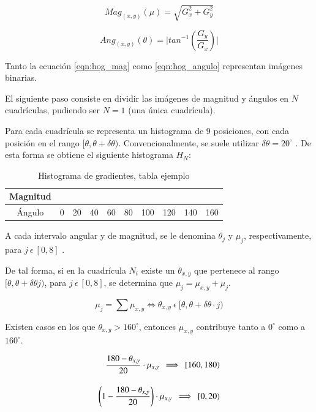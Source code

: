 \begin{equation}
	\label{eqn:hog_mag}
	Mag_{(x,y)} (\mu)= \sqrt{G_{x}^{2}+G_{y}^{2}}
\end{equation}

\begin{equation}
	\label{eqn:hog_angulo}
	Ang_{(x,y)} (\theta) = \lvert tan^{-1}(\dfrac{G_{y}}{G_{x}})\lvert
\end{equation}

Tanto la ecuación \ref{eqn:hog_mag} como \ref{eqn:hog_angulo} representan imágenes binarias.

El siguiente paso consiste en dividir las imágenes de magnitud y ángulos en $ N $ cuadrículas, pudiendo ser $ N = 1 $ (una única cuadrícula).

Para cada cuadrícula se representa un histograma de 9 posiciones, con cada posición en el rango $ [\theta,\theta+\delta\theta) $. Convencionalmente, se suele utilizar $\delta\theta = 20^{\circ}$ . De esta forma se obtiene el siguiente histograma $ H_{N}$:

\begin{table}[htb]
	\centering
	\caption{Histograma de gradientes, tabla ejemplo}
	\label{tab:hog_histograma_tabla}
	\begin{tabular}{|c||c|c|c|c|c|c|c|c|c|}
		\hline
		Magnitud &    &    &    &    &    &     &     &     &     \\ \hline
		Ángulo   & 0  & 20 & 40 & 60 & 80 & 100 & 120 & 140 & 160 \\ \hline
	\end{tabular}
\end{table}

A cada intervalo angular y de magnitud, se le denomina $ \theta_{j} $ y $ \mu_{j} $, respectivamente, para $ j\:\epsilon\:[0,8]$ .

De tal forma, si en la cuadrícula $ N_{i} $ existe un $\theta_{x,y}$ que pertenece al rango $ [\theta,\theta+\delta\theta j) $, para $ j\:\epsilon\:[0,8]$, se determina que $ \mu_{j} = \mu_{x,y} + \mu_{j}$.

\begin{equation}
	\label{eqn:hog_sum_magnitudes}
	\mu_{j} = \sum{\mu_{x,y}} \iff \theta_{x,y}\:\epsilon\:[\theta,\theta+\delta\theta \cdot j)
\end{equation}

Existen casos en los que $\theta_{x,y} > 160^{\circ}$, entonces $\mu_{x,y}$ contribuye tanto a $ 0^{\circ} $ como a $160^{\circ}$.

\begin{equation}
	\setlength{\jot}{14pt}
	\label{eqn:hog_angulo_mayor_de_160}
	\begin{split}
		\dfrac{180-\theta_{x,y}}{20}\cdot \mu_{x,y}\:\implies\: [160,180) \\
		\left(1-\dfrac{180-\theta_{x,y}}{20}\right)\cdot \mu_{x,y}\:\implies\: [0,20)
	\end{split}	
\end{equation}

